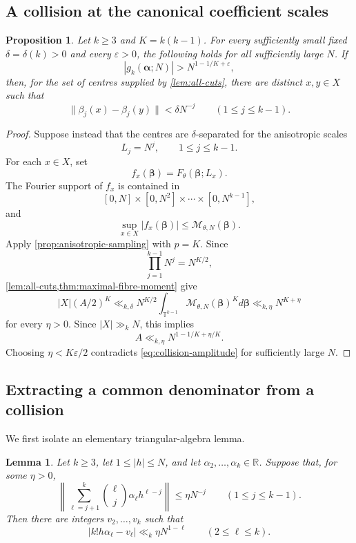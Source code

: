 \documentclass[11pt,reqno]{amsart}
\numberwithin{equation}{section}
\newtheorem{proposition}[proposition]{Proposition}
\newtheorem{lemma}[lemma]{Lemma}
\theoremstyle{definition}
\theoremstyle{remark}
\newcommand{\R}{\mathbb R}
\newcommand{\T}{\mathbb T}
\newcommand{\cM}{\mathcal M}
\begin{document}
\subsection{A collision at the canonical coefficient scales}

\begin{proposition}\label{prop:orbit-collision}
Let $k\ge3$ and $K=k(k-1)$.  For every sufficiently small fixed
$\delta=\delta(k)>0$ and every $\varepsilon>0$, the following holds for all sufficiently large $N$.  If
\begin{equation}\label{eq:collision-amplitude}
  |g_k(\boldsymbol\alpha;N)|
  >N^{1-1/K+\varepsilon},
\end{equation}
then, for the set of centres supplied by \cref{lem:all-cuts}, there are distinct $x,y\in X$ such that
\begin{equation}\label{eq:centre-collision}
  \|\beta_j(x)-\beta_j(y)\|
  <\delta N^{-j}
  \qquad(1\le j\le k-1).
\end{equation}
\end{proposition}

\begin{proof}
Suppose instead that the centres are $\delta$-separated for the anisotropic scales
\[
  L_j=N^j,
  \qquad 1\le j\le k-1.
\]
For each $x\in X$, set
\[
  f_x(\boldsymbol\beta)
  =F_\theta(\boldsymbol\beta;L_x).
\]
The Fourier support of $f_x$ is contained in
\[
  [0,N]\times[0,N^2]\times\cdots\times[0,N^{k-1}],
\]
and
\[
  \sup_{x\in X}|f_x(\boldsymbol\beta)|
  \le \cM_{\theta,N}(\boldsymbol\beta).
\]
Apply \cref{prop:anisotropic-sampling} with $p=K$.  Since
\[
  \prod_{j=1}^{k-1}N^j=N^{K/2},
\]
\cref{lem:all-cuts,thm:maximal-fibre-moment} give
\[
  |X|(A/2)^K
  \ll_{k,\delta}
  N^{K/2}
  \int_{\T^{k-1}}\cM_{\theta,N}(\boldsymbol\beta)^K
  d\boldsymbol\beta
  \ll_{k,\eta}N^{K+\eta}
\]
for every $\eta>0$.  Since $|X|\gg_kN$, this implies
\[
  A\ll_{k,\eta}N^{1-1/K+\eta/K}.
\]
Choosing $\eta<K\varepsilon/2$ contradicts \eqref{eq:collision-amplitude} for sufficiently large $N$.
\end{proof}

\subsection{Extracting a common denominator from a collision}

We first isolate an elementary triangular-algebra lemma.

\begin{lemma}\label{lem:triangular-extraction}
Let $k\ge3$, let $1\le |h|\le N$, and let
$\alpha_2,\ldots,\alpha_k\in\R$.  Suppose that, for some $\eta>0$,
\begin{equation}\label{eq:relative-translation-approx}
  \left\|
  \sum_{\ell=j+1}^{k}
  \binom{\ell}{j}\alpha_\ell h^{\ell-j}
  \right\|
  \le \eta N^{-j}
  \qquad(1\le j\le k-1).
\end{equation}
Then there are integers $v_2,\ldots,v_k$ such that
\begin{equation}\label{eq:triangular-output}
  |k!h\alpha_\ell-v_\ell|
  \ll_k \eta N^{1-\ell}
  \qquad(2\le\ell\le k).
\end{equation}
\end{lemma}
\end{document}
